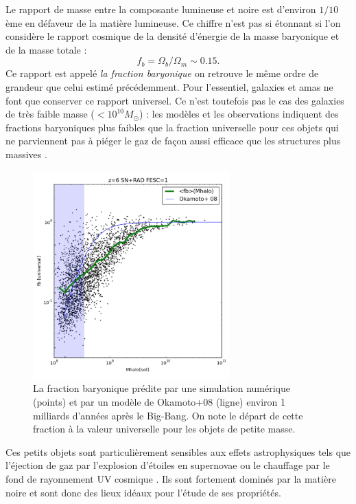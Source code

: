 Le rapport de masse entre la composante lumineuse et noire est d'environ $1/10$ème en défaveur de la matière lumineuse. Ce chiffre n'est pas si étonnant si l'on considère le rapport cosmique de la densité d'énergie de la masse baryonique et de la masse totale :
\begin{equation}
f_b=\Omega_b/\Omega_m\sim0.15.
\end{equation}
Ce rapport est appelé \textit{la fraction baryonique} on retrouve le même ordre de grandeur que celui estimé précédemment. Pour l'essentiel, galaxies et amas ne font que conserver ce rapport universel. Ce n'est toutefois pas le cas des galaxies de très faible masse ($<10^{10} M_\odot$) : les modèles et les observations indiquent des fractions baryoniques plus faibles que la fraction universelle pour ces objets qui ne parviennent pas à piéger le gaz de façon aussi efficace que les structures plus massives . 
\begin{figure}[htbp]
	\centering
		\includegraphics[height=8cm]{figs/fbar.png}
	\caption[La fraction baryonique prédite par une simulation numérique]{La fraction baryonique prédite par une simulation numérique (points) et par un modèle de Okamoto+08 (ligne) environ 1 milliards d'années après le Big-Bang. On note le départ de cette fraction à la valeur universelle pour les objets de petite masse.} 
	\label{f:fbar}
\end{figure}
Ces petits objets sont particulièrement sensibles aux effets astrophysiques tels que l'éjection de gaz par l'explosion d'étoiles en supernovae ou le chauffage par le fond de rayonnement UV cosmique . Ils sont fortement dominés par la matière noire et sont donc des lieux idéaux pour l'étude de ses propriétés.

